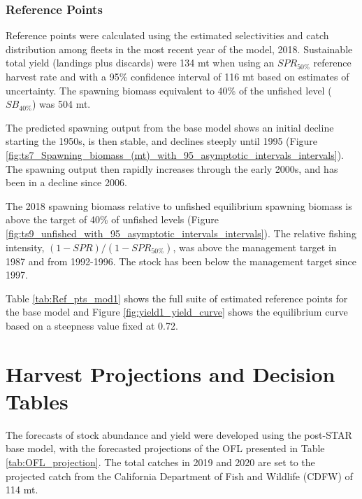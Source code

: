 \documentclass[12pt,]{article}
\begin{document}
\subsubsection{Reference Points}\label{reference-points-1}

Reference points were calculated using the estimated selectivities and
catch distribution among fleets in the most recent year of the model,
2018. Sustainable total yield (landings plus discards) were 134 mt when
using an \(SPR_{50\%}\) reference harvest rate and with a 95\%
confidence interval of 116 mt based on estimates of uncertainty. The
spawning biomass equivalent to 40\% of the unfished level
(\(SB_{40\%}\)) was 504 mt.

The predicted spawning output from the base model shows an initial
decline starting the 1950s, is then stable, and declines steeply until
1995 (Figure
\ref{fig:ts7_Spawning_biomass_(mt)_with_95_asymptotic_intervals_intervals}).\\
The spawning output then rapidly increases through the early 2000s, and
has been in a decline since 2006.

The 2018 spawning biomass relative to unfished equilibrium spawning
biomass is above the target of 40\% of unfished levels (Figure
\ref{fig:ts9_unfished_with_95_asymptotic_intervals_intervals}). The
relative fishing intensity, \((1-SPR)/(1-SPR_{50\%})\), was above the
management target in 1987 and from 1992-1996. The stock has been below
the management target since 1997.

Table \ref{tab:Ref_pts_mod1} shows the full suite of estimated reference
points for the base model and Figure \ref{fig:yield1_yield_curve} shows
the equilibrium curve based on a steepness value fixed at 0.72.

\section{Harvest Projections and Decision
Tables}\label{harvest-projections-and-decision-tables}

The forecasts of stock abundance and yield were developed using the
post-STAR base model, with the forecasted projections of the OFL
presented in Table \ref{tab:OFL_projection}. The total catches in 2019
and 2020 are set to the projected catch from the California Department
of Fish and Wildlife (CDFW) of 114 mt.
\end{document}
